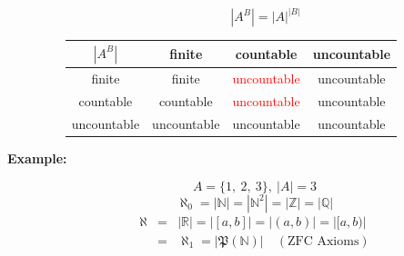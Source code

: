 \documentclass[english,dvipdfmx]{jsarticle}
\begin{document}
\begin{description}
\begin{enumerate}
\begin{equation*}
                        | A^B | = | A |^{| B |}
                    \end{equation*}
                    \begin{table}[H]
                        \begin{center}
                        \begin{tabular}{|c|c|c|c|} \hline
                            $|A^B| $& finite & countable & uncountable \\ \hline
                            finite & finite &  \textcolor{red}{uncountable} & uncountable \\ \hline
                            countable & countable & \textcolor{red}{uncountable} & uncountable \\ \hline
                            uncountable & uncountable & uncountable & uncountable \\ \hline
                        \end{tabular}
                    \end{center}
                    \end{table}
            \end{enumerate}
        \item[\bf{Example:}]
            \begin{equation*}
                A = \{ 1,\ 2,\ 3 \} ,\ |A| = 3
            \end{equation*}
            \begin{equation*}
                \aleph_0 = | \mathbb{N} | = | \mathbb{N}^2| = | \mathbb{Z} | = | \mathbb{Q} |
            \end{equation*}
            \begin{eqnarray*}
                \aleph &=& | \mathbb{R} | = | [a,b] | = | (a,b) | = | [a,b) | \\
                &=& \aleph_1 = |\mathfrak{P}(\mathbb{N})| \quad ( \text{ZFC Axioms} )
            \end{eqnarray*}
    \end{description}
\end{document}
